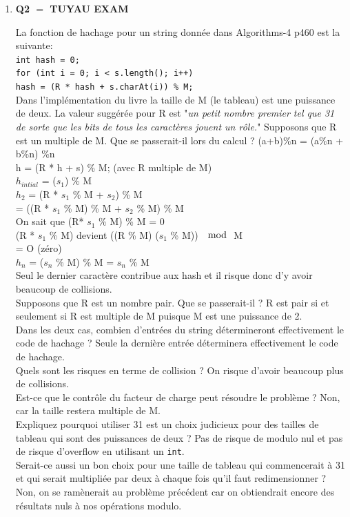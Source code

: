 \documentclass[11pt]{article}
\begin{document}
\begin{enumerate}
\item \centerline{\textbf{\color{red}Q2 $=$ TUYAU EXAM}}La fonction de hachage pour un string donnée dans Algorithms-4 p460 est la suivante:\\
\texttt{int hash = 0;\\
for (int i = 0; i < s.length(); i++)\\
hash = (R * hash + s.charAt(i)) \% M;\\}
Dans l’implémentation du livre la taille de M (le tableau) est une puissance de deux.
La valeur suggérée pour R est "\textit{un petit nombre premier tel que 31 de sorte que les bits de tous les caractères jouent un rôle.}" Supposons que R est un multiple de M. Que se
passerait-il lors du calcul ?
{\color{dkgreen} (a+b)\%n = (a\%n + b\%n) \%n \\
h = (R * h + s) \% M; (avec R multiple de M)\\
$h_{intial}$ = ($s_{1}$) \% M\\
$h_2$ = (R * $s_1$ \% M + $s_2$) \% M\\
= ((R * $s_1$ \% M) \% M + $s_2$ \% M) \% M\\
On sait que (R* $s_1$ \% M) \% M = 0\\
(R * $s_1$ \% M) devient ((R \% M) ($s_1$ \% M)) $\mod$ M\\
= O (zéro) \\
$h_n$ = ($s_n$ \% M) \% M = $s_n$ \% M
\\Seul le dernier caractère contribue aux hash et il risque donc d'y avoir beaucoup de collisions.}
\\Supposons que R est un nombre pair. Que se passerait-il ?
{\color{dkgreen}R est pair si et seulement si R est multiple de M puisque M est une puissance de 2.}
\\Dans les deux cas, combien d’entrées du string détermineront effectivement le code
de hachage ?
{\color{dkgreen}Seule la dernière entrée déterminera effectivement le code de hachage.}
\\Quels sont les risques en terme de collision ?
{\color{dkgreen}On risque d'avoir beaucoup plus de collisions.}
\\Est-ce que le contrôle du facteur de charge peut résoudre le problème ?
{\color{dkgreen}Non, car la taille restera multiple de M.}
\\ Expliquez pourquoi utiliser 31 est un choix judicieux pour des tailles de tableau qui sont des puissances de deux ?
{\color{dkgreen}Pas de risque de modulo nul et pas de risque d'overflow en utilisant un \texttt{int}.}
\\Serait-ce aussi un bon choix pour une taille de tableau qui commencerait à 31 et qui serait multipliée par deux à chaque fois qu'il faut redimensionner ?
{\color{dkgreen}Non, on se ramènerait au problème précédent car on obtiendrait encore des résultats nuls à nos opérations modulo.}


\end{enumerate}
\end{document}
